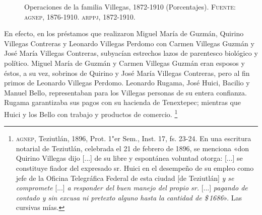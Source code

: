 \documentclass[14pt,twoside,final]{extbook} %
\let\oldfootnote\footnote
\renewcommand\footnote[1]{%
\oldfootnote{\hspace{1mm}#1}}
\begin{document}
\begin{figure}
\centering
{}
\caption[Operaciones de la familia Villegas, 1872-1910 (Porcentajes)]{Operaciones de la familia Villegas, 1872-1910 (Porcentajes). \textsc{Fuente:} \textsc{agnep}, 1876-1910. \textsc{arppj}, 1872-1910.}
\label{fig:porcentajes}
\end{figure}

En efecto, en los préstamos que realizaron Miguel María de Guzmán, Quirino Villegas Contreras y Leonardo Villegas Perdomo con Carmen Villegas Guzmán y José María Villegas Contreras, subyacían estrechos lazos de parentesco biológico y político. Miguel María de Guzmán y Carmen Villegas Guzmán eran esposos y éstos, a su vez, sobrinos de Quirino y José María Villegas Contreras, pero al fin primos de Leonardo Villegas Perdomo. Leonardo Rugama, José Huici, Bacilio y Manuel Bello, representaban para los Villegas personas de su entera confianza. Rugama garantizaba sus pagos con su hacienda de Tenextepec; mientras que Huici y los Bello con trabajo y productos de comercio.\footnote{\textsc{agnep}, Teziutlán, 1896, Prot. 1"er Sem., Inst. 17, fs. 23-24. En una escritura notarial de Teziutlán,\index[lugares]{Teziutlan@Teziutlán} celebrada el 21 de febrero de 1896, se menciona «don Quirino Villegas dijo [...] de su libre y espontánea voluntad otorga: [...] se constituye fiador del expresado sr. Huici en el desempeño de su empleo como jefe de la Oficina Telegráfica Federal de esta ciudad [de Teziutlán] \emph{y se compromete} [...] \emph{a responder del buen manejo del propio sr.} [...] \emph{pagando de contado y sin excusa ni pretexto alguno hasta la cantidad de \$\,1686}». Las cursivas mías.}
\end{document}
